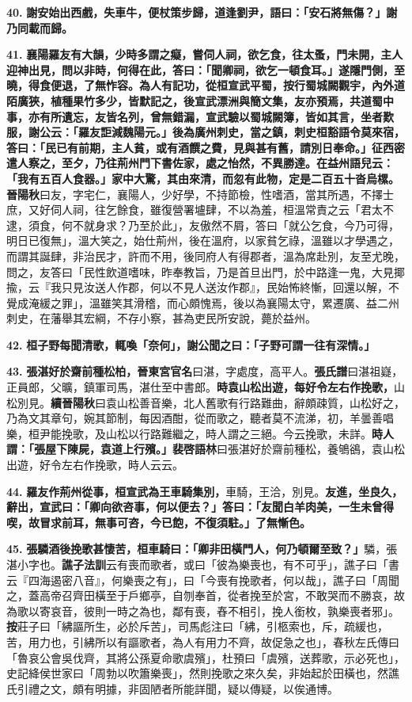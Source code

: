 \textbf{40.} \textbf{謝安始出西戲，失車牛，便杖策步歸，道逢劉尹，語曰：「安石將無傷？」謝乃同載而歸。}

\textbf{41.} \textbf{襄陽羅友有大韻，少時多謂之癡，嘗伺人祠，欲乞食，往太蚤，門未開，主人迎神出見，問以非時，何得在此，答曰：「聞卿祠，欲乞一頓食耳。」遂隱門側，至曉，得食便退，了無怍容。為人有記功，從桓宣武平蜀，按行蜀城闕觀宇，內外道陌廣狹，植種果竹多少，皆默記之，後宣武漂洲與簡文集，友亦預焉，共道蜀中事，亦有所遺忘，友皆名列，曾無錯漏，宣武驗以蜀城闕簿，皆如其言，坐者歎服，謝公云：「羅友詎減魏陽元。」後為廣州刺史，當之鎮，刺史桓豁語令莫來宿，答曰：「民已有前期，主人貧，或有酒饌之費，見與甚有舊，請別日奉命。」征西密遣人察之，至夕，乃往荊州門下書佐家，處之怡然，不異勝達。在益州語兒云：「我有五百人食器。」家中大驚，其由來清，而忽有此物，定是二百五十沓烏樏。}{\footnotesize \textbf{晉陽秋}曰友，字宅仁，襄陽人，少好學，不持節檢，性嗜酒，當其所遇，不擇士庶，又好伺人祠，往乞餘食，雖復營署壚肆，不以為羞，桓溫常責之云「君太不逮，須食，何不就身求？乃至於此」，友傲然不屑，答曰「就公乞食，今乃可得，明日已復無」，溫大笑之，始仕荊州，後在溫府，以家貧乞祿，溫雖以才學遇之，而謂其誕肆，非治民才，許而不用，後同府人有得郡者，溫為席赴別，友至尤晚，問之，友答曰「民性飲道嗜味，昨奉教旨，乃是首旦出門，於中路逢一鬼，大見揶揄，云『我只見汝送人作郡，何以不見人送汝作郡』，民始怖終慚，回還以解，不覺成淹緩之罪」，溫雖笑其滑稽，而心頗愧焉，後以為襄陽太守，累遷廣、益二州刺史，在藩舉其宏綱，不存小察，甚為吏民所安說，薨於益州。}

\textbf{42.} \textbf{桓子野每聞清歌，輒喚「奈何」，謝公聞之曰：「子野可謂一往有深情。」}

\textbf{43.} \textbf{張湛好於齋前種松柏，}{\footnotesize \textbf{晉東宮官名}曰湛，字處度，高平人。\textbf{張氏譜}曰湛祖嶷，正員郎，父曠，鎮軍司馬，湛仕至中書郎。}\textbf{時袁山松出遊，每好令左右作挽歌，}{\footnotesize 山松別見。\textbf{續晉陽秋}曰袁山松善音樂，北人舊歌有行路難曲，辭頗疎質，山松好之，乃為文其章句，婉其節制，每因酒酣，從而歌之，聽者莫不流涕，初，羊曇善唱樂，桓尹能挽歌，及山松以行路難繼之，時人謂之三絕。今云挽歌，未詳。}\textbf{時人謂：「張屋下陳屍，袁道上行殯。」}{\footnotesize \textbf{裴啓語林}曰張湛好於齋前種松，養鴝鵒，袁山松出遊，好令左右作挽歌，時人云云。}

\textbf{44.} \textbf{羅友作荊州從事，桓宣武為王車騎集別，}{\footnotesize 車騎，王洽，別見。}\textbf{友進，坐良久，辭出，宣武曰：「卿向欲咨事，何以便去？」答曰：「友聞白羊肉美，一生未曾得喫，故冒求前耳，無事可咨，今已飽，不復須駐。」了無慚色。}

\textbf{45.} \textbf{張驎酒後挽歌甚悽苦，桓車騎曰：「卿非田橫門人，何乃頓爾至致？」}{\footnotesize 驎，張湛小字也。\textbf{譙子法訓}云有喪而歌者，或曰「彼為樂喪也，有不可乎」，譙子曰「書云『四海遏密八音』，何樂喪之有」，曰「今喪有挽歌者，何以哉」，譙子曰「周聞之，蓋高帝召齊田橫至于戶鄉亭，自刎奉首，從者挽至於宮，不敢哭而不勝哀，故為歌以寄哀音，彼則一時之為也，鄰有喪，舂不相引，挽人銜枚，孰樂喪者邪」。\textbf{按}莊子曰「紼謳所生，必於斥苦」，司馬彪注曰「紼，引柩索也，斥，疏緩也，苦，用力也，引紼所以有謳歌者，為人有用力不齊，故促急之也」，春秋左氏傳曰「魯哀公會吳伐齊，其將公孫夏命歌虞殯」，杜預曰「虞殯，送葬歌，示必死也」，史記絳侯世家曰「周勃以吹簫樂喪」，然則挽歌之來久矣，非始起於田橫也，然譙氏引禮之文，頗有明據，非固陋者所能詳聞，疑以傳疑，以俟通博。}

